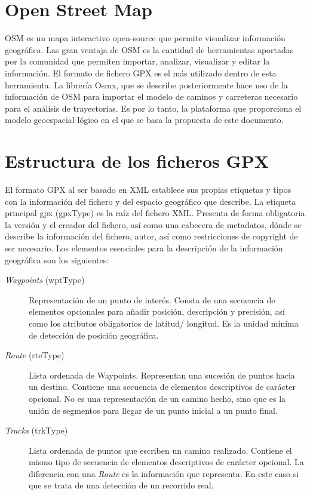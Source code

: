 \section{Open Street Map}
\ac{OSM} es un mapa interactivo open-source que permite visualizar información geográfica. Las gran ventaja 
de \ac{OSM} es la cantidad de herramientas aportadas por la comunidad que permiten importar, analizar, 
visualizar y editar la información. El formato de fichero \ac{GPX} es el más utilizado dentro de esta 
herramienta. La librería Osmx, que se describe posteriormente hace uso de la información de \ac{OSM} para
importar el modelo de caminos y carreteras necesario para el análisis de trayectorias. Es por lo tanto, la 
plataforma que proporciona el modelo geoespacial lógico en el que se basa la propuesta de este documento.

\section{Estructura de los ficheros \ac{GPX}}
El formato \ac{GPX} al ser basado en \ac{XML} establece sus propias etiquetas y tipos con la información 
del fichero y del espacio geográfico que describe. La etiqueta principal gpx (gpxType) es la raíz del 
fichero \ac{XML}. Presenta de forma obligatoria la versión y el creador del fichero, así como una cabecera 
de metadatos, dónde se describe la información del fichero, autor, así como restricciones de copyright 
de ser necesario. Los elementos esenciales para la descripción de la información geográfica son los 
siguientes:
\begin{description}
\item[\textit{Waypoints} (wptType)] Representación de un punto de interés. Consta de una secuencia de 
elementos 
opcionales para añadir posición, descripción y precisión, así como los atributos obligatorios de latitud/
longitud. Es la unidad mínima de detección de posición geográfica.

\item[\textit{Route} (rteType)] Lista ordenada de Waypoints.  Representan una sucesión de puntos hacia un 
destino. Contiene una secuencia de elementos descriptivos de carácter opcional. No es una representación
de un camino hecho, sino que es la unión de segmentos para llegar de un punto inicial a un punto final. 

\item[\textit{Tracks} (trkType)] Lista ordenada de puntos que escriben un camino realizado. Contiene el 
mismo tipo de secuencia de elementos descriptivos de carácter opcional. La diferencia con una \textit{Route}
es la información que representa. En este caso si que se trata de una detección de un recorrido real.
\end{description}

